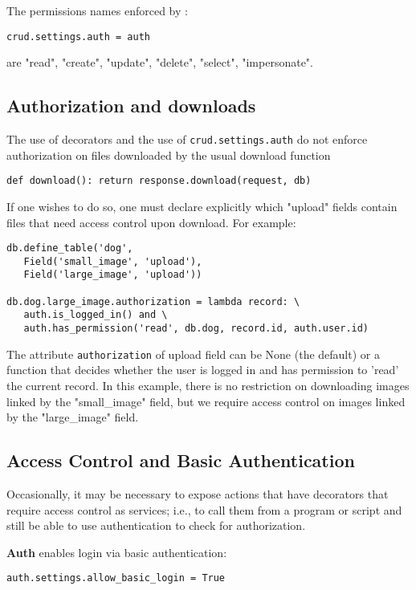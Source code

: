 \documentclass[justified,sixbynine,notoc]{tufte-book}
\def\ft{\small\tt}
\begin{document}
\begin{fullwidth}
The permissions names enforced by :

\begin{lstlisting}
crud.settings.auth = auth
\end{lstlisting}
\noindent are "read", "create", "update", "delete", "select", "impersonate".

\goodbreak\subsection{Authorization and downloads}

The use of decorators and the use of {\ft crud.settings.auth} do not enforce authorization on files downloaded by the usual download function
\begin{lstlisting}
def download(): return response.download(request, db)
\end{lstlisting}

If one wishes to do so, one must declare explicitly which "upload" fields contain files that need access control upon download.
For example:
\begin{lstlisting}
db.define_table('dog',
   Field('small_image', 'upload'),
   Field('large_image', 'upload'))

db.dog.large_image.authorization = lambda record: \
   auth.is_logged_in() and \
   auth.has_permission('read', db.dog, record.id, auth.user.id)
\end{lstlisting}

The attribute {\ft authorization} of upload field can be None (the default) or a function that decides whether the user is logged in and has permission to 'read' the current record. In this example, there is no restriction on downloading images linked by the "small\_image" field, but we require access control on images linked by the "large\_image" field.

\goodbreak\subsection{Access Control and Basic Authentication}

Occasionally, it may be necessary to expose actions that have decorators that require access control as services; i.e., to call them from a program or script and still be able to use authentication to check for authorization.

{\bf Auth} enables login via basic authentication:
\begin{lstlisting}
auth.settings.allow_basic_login = True
\end{lstlisting}


\end{fullwidth}
\end{document}
